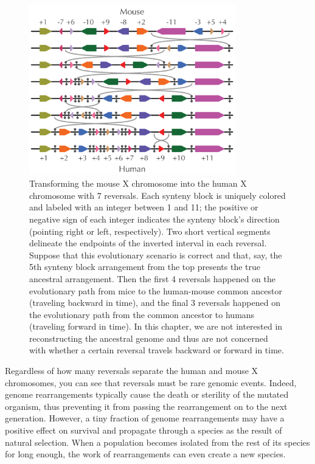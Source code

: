\begin{figure}[h]
\mySfFamily
\centering
\includegraphics[width=0.8\textwidth]{images/rearrangements/transforming_mouse_into_human_7_reversals}
\caption{Transforming the mouse X chromosome into the human X chromosome with 7 reversals. Each synteny block is uniquely colored and labeled with an integer between 1 and 11; the positive or negative sign of each integer indicates the synteny block's direction (pointing right or left, respectively). Two short vertical segments delineate the endpoints of the inverted interval in each reversal. Suppose that this evolutionary scenario is correct and that, say, the 5th synteny block arrangement from the top presents the true ancestral arrangement. Then the first 4 reversals happened on the evolutionary path from mice to the human-mouse common ancestor (traveling backward in time), and the final 3 reversals happened on the evolutionary path from the common ancestor
to humans (traveling forward in time).  In this chapter, we are not interested in reconstructing the ancestral genome and thus are not concerned with whether a certain reversal travels backward or forward in time.}
\label{fig:transforming_mouse_into_human_7_reversals}
\end{figure}

\noindent Regardless of how many reversals separate the human and mouse X chromosomes, you can see that reversals must be rare genomic events.  Indeed, genome rearrangements typically cause the death or sterility of the mutated organism, thus preventing it from passing the rearrangement on to the next generation.  However, a tiny fraction of genome rearrangements may have a positive effect on survival and propagate through a species as the result of natural selection.  When a population becomes isolated from the rest of its species for long enough, the work of rearrangements can even create a new species.

